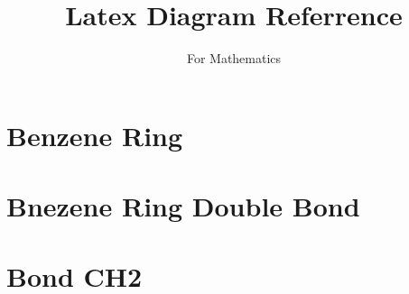 \documentclass[17pt]{extarticle}
\title{Latex Diagram Referrence}
\author{For Mathematics}
\date{ }
\begin{document}
\titleformat{\section}{\normalfont\normalsize\bfseries}{\thesection}{1em}{}
\titlespacing{\section}{0pt}{0pt}{-0.3 cm}  





\section {Benzene Ring}

\begin{LTXexample}[pos=b,preset=\centering,width=1\linewidth]
  \vspace{5mm}
  \vspace{5mm}
\end{LTXexample}

\pagebreak


\section {Bnezene Ring Double Bond}

\begin{LTXexample}[pos=b,preset=\centering,width=1\linewidth]
  \vspace{5mm}
  \vspace{5mm}
\end{LTXexample}

\pagebreak

\section {Bond CH2}
\end{document}
